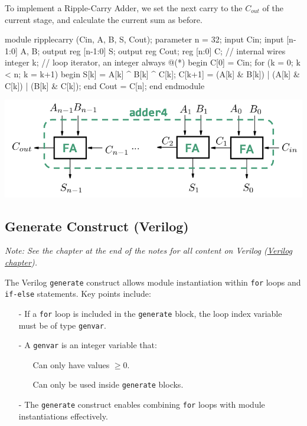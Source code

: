 \documentclass[12pt,openany]{book}
\begin{document}
To implement a Ripple-Carry Adder, we set the next carry to the $C_{out}$ of the current stage, and calculate the current sum as before.
\newline
\vspace*{10px}
\begin{minipage}[htp]{0.45\textwidth}	
	\begin{vhdl}
module ripplecarry (Cin, A, B, S, Cout);
	parameter n = 32;
	input Cin;
	input [n-1:0] A, B;
	output reg [n-1:0] S;
	output reg Cout;
	reg [n:0] C; // internal wires
	integer k; // loop iterator, an integer
	always @(*) begin
		C[0] = Cin;
		for (k = 0; k < n; k = k+1) begin
		S[k] = A[k] ^ B[k] ^ C[k];
		C[k+1] = (A[k] & B[k]) | (A[k] & C[k]) | (B[k] & C[k]);
	end
	Cout = C[n];
	end
endmodule
	\end{vhdl}
\end{minipage}
\hfill
\vline
\hfill
\begin{minipage}[htp]{0.45\textwidth}
	\begin{center}
		\includegraphics[width=1.3\textwidth]{circuits/10.2.4_2.png}
	\end{center}	
\end{minipage}

\subsection{Generate Construct (Verilog)}
 \textit{Note: See the chapter at the end of the notes for all content on Verilog (\hyperref[Verilog]{Verilog chapter}).}

The Verilog \texttt{generate} construct allows module instantiation within \texttt{for} loops and \texttt{if-else} statements. Key points include:

\begin{itemize}
    \item[-] If a \texttt{for} loop is included in the \texttt{generate} block, the loop index variable must be of type \texttt{genvar}.
    \item[-] A \texttt{genvar} is an integer variable that:
    \begin{itemize}
        \item[] Can only have values $\geq 0$.
        \item[] Can only be used inside \texttt{generate} blocks.
    \end{itemize}
    \item[-] The \texttt{generate} construct enables combining \texttt{for} loops with module instantiations effectively.
\end{itemize}
\vfill
\end{document}
